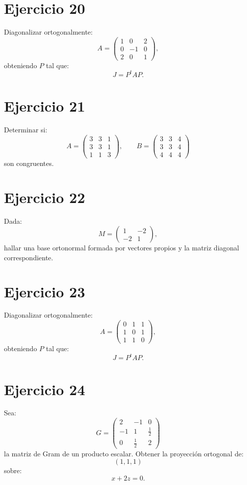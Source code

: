 \documentclass[11pt,a4paper]{article}
\begin{document}
\section{Ejercicio 20}
Diagonalizar ortogonalmente:
\[
A=
\begin{pmatrix}
1&0&2\\
0&-1&0\\
2&0&1
\end{pmatrix},
\]
obteniendo $P$ tal que:
\[
J=P^tAP.
\]

\section{Ejercicio 21}
Determinar si:
\[
A=
\begin{pmatrix}
3&3&1\\
3&3&1\\
1&1&3
\end{pmatrix},
\qquad
B=
\begin{pmatrix}
3&3&4\\
3&3&4\\
4&4&4
\end{pmatrix}
\]
son congruentes.

\section{Ejercicio 22}
Dada:
\[
M=
\begin{pmatrix}
1&-2\\
-2&1
\end{pmatrix},
\]
hallar una base ortonormal formada por vectores propios y la matriz diagonal correspondiente.

\section{Ejercicio 23}
Diagonalizar ortogonalmente:
\[
A=
\begin{pmatrix}
0&1&1\\
1&0&1\\
1&1&0
\end{pmatrix},
\]
obteniendo $P$ tal que:
\[
J=P^tAP.
\]

\section{Ejercicio 24}
Sea:
\[
G=
\begin{pmatrix}
2&-1&0\\
-1&1&\frac12\\
0&\frac12&2
\end{pmatrix}
\]
la matriz de Gram de un producto escalar. Obtener la proyección ortogonal de:
\[
(1,1,1)
\]
sobre:
\[
x+2z=0.
\]
\end{document}
